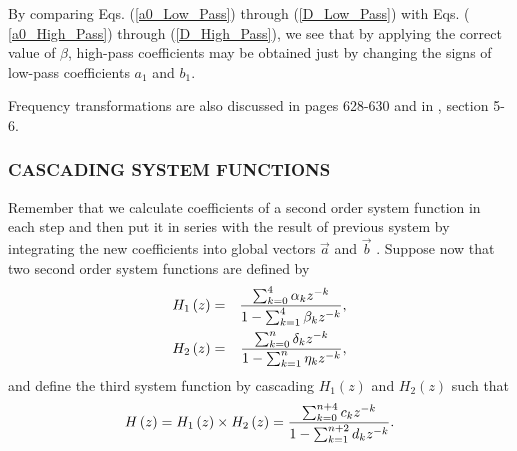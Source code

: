 \documentclass{sebase}
\begin{document}

\begin{remark}
By comparing Eqs. (\ref{a0_Low_Pass}) through (\ref{D_Low_Pass}) with Eqs. (%
\ref{a0_High_Pass}) through (\ref{D_High_Pass}), we see that by applying the
correct value of $\beta $, high-pass coefficients may be obtained just by
changing the signs of low-pass coefficients $a_{1}$ and $b_{1}$.
\end{remark}


Frequency transformations are also discussed in \cite{Smith} pages 628-630
and in \cite{Mitra}, section 5-6.

\subsubsection{CASCADING SYSTEM FUNCTIONS}

Remember that we calculate coefficients of a second order system function in
each step and then put it in series with the result of previous system by
integrating the new coefficients into global vectors $\vec{a}$ and $\vec{b}$%
. Suppose now that two second order system functions are defined by 
\begin{eqnarray}
H_{1}\left( z\right) &=&\frac{\sum_{k=0}^{4}\alpha _{k}z^{-k}}{%
1-\sum_{k=1}^{4}\beta _{k}z^{-k}},  \label{H_1} \\
H_{2}\left( z\right) &=&\frac{\sum_{k=0}^{n}\delta _{k}z^{-k}}{%
1-\sum_{k=1}^{n}\eta _{k}z^{-k}},  \label{H_2}
\end{eqnarray}
and define the third system function by cascading $H_{1}\left( z\right) $
and $H_{2}\left( z\right) $ such that 
\begin{equation}
H\left( z\right) =H_{1}\left( z\right) \times H_{2}\left( z\right) =\frac{%
\sum_{k=0}^{n+4}c_{k}z^{-k}}{1-\sum_{k=1}^{n+2}d_{k}z^{-k}}.
\label{Cascade_Digital}
\end{equation}
\end{document}
